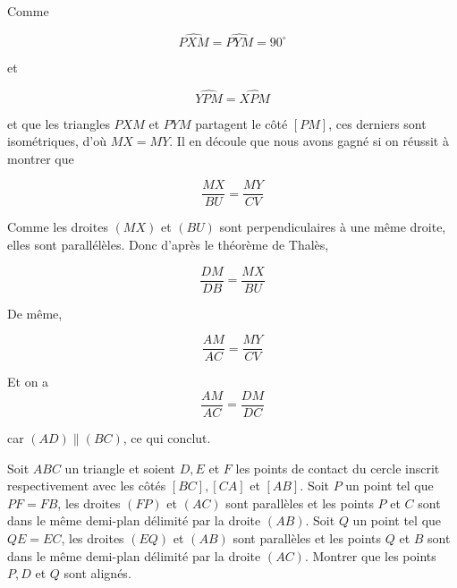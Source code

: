 \begin{sol}
Comme

\[\widehat{PXM} = \widehat{PYM} = 90 ^ {\circ}\]

et

\[\widehat{YPM} =\widehat{XPM}\]

et que les triangles $PXM$ et $PYM$ partagent le côté $[PM]$, ces derniers sont isométriques, d'où $MX=MY$. Il en découle que nous avons gagné si on réussit à montrer que

\[\frac{MX}{BU}=\frac{MY}{CV}\]

Comme les droites $(MX)$ et $(BU)$ sont perpendiculaires à une même droite, elles sont parallélèles. Donc d'après le théorème de Thalès,

\[ \frac{DM}{DB}=\frac{MX}{BU}\]


De même,

\[\frac{AM}{AC}=\frac{MY}{CV}\]

Et on a
\[\frac{AM}{AC}=\frac{DM}{DC}\]

car $(AD) \parallel (BC)$, ce qui conclut.
\end{sol}

\begin{exo}
Soit $ABC$ un triangle et soient $D,E$ et $F$ les points de contact du cercle inscrit respectivement avec les côtés $[BC], [CA]$ et $[AB]$. Soit $P$ un point tel que $PF=FB$, les droites $(FP)$ et $(AC)$ sont parallèles et les points $P$ et $C$ sont dans le même demi-plan délimité par la droite $(AB)$. Soit $Q$ un point tel que $QE=EC$, les droites $(EQ)$ et $(AB)$ sont parallèles et les points $Q$ et $B$ sont dans le même demi-plan délimité par la droite $(AC)$. Montrer que les points $P, D$ et $Q$ sont alignés.
\end{exo}

